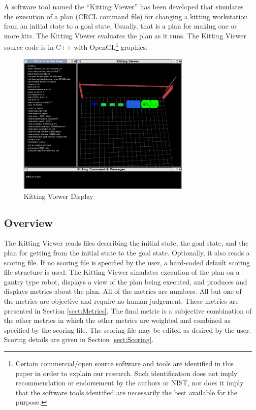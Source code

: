A software tool named the ``Kitting Viewer'' has been developed that
simulates the execution of a plan (CRCL command file) for changing a
kitting workstation from an initial state to a goal state. Usually, that is
a plan for making one or more kits. The Kitting Viewer evaluates the plan
as it runs. The Kitting Viewer source code is in C++ with OpenGL\footnote{Certain commercial/open source software and tools are identified in this paper in order to explain our research. Such identification does not imply
recommendation or endorsement by the authors or NIST, nor does it imply that the software tools identified are necessarily the best available for the purpose.} graphics.

\begin{figure}[ht!]
\centering
\includegraphics[width=8.5cm]{images/kittingViewer2013Feb23.jpg}
\caption{Kitting Viewer Display}
\label{fig:KittingViewer}
\end{figure}

\subsection{Overview}

The Kitting Viewer reads files describing the initial state, the goal
state, and the plan for getting from the initial state to the goal state.
Optionally, it also reads a scoring file. If no scoring file is specified
by the user, a hard-coded default scoring file structure is used. The
Kitting Viewer simulates execution of the plan on a gantry type robot,
displays a view of the plan being executed, and produces and displays
metrics about the plan. All of the metrics are numbers. All but one of the
metrics are objective and require no human judgement. These metrics are
presented in Section
\ref{sect:Metrics}. The final metric is a subjective combination of the
other metrics in which the other metrics are weighted and combined as
specified by the scoring file. The scoring file may be edited as desired by
the user. Scoring details are given in Section \ref{sect:Scoring}.

